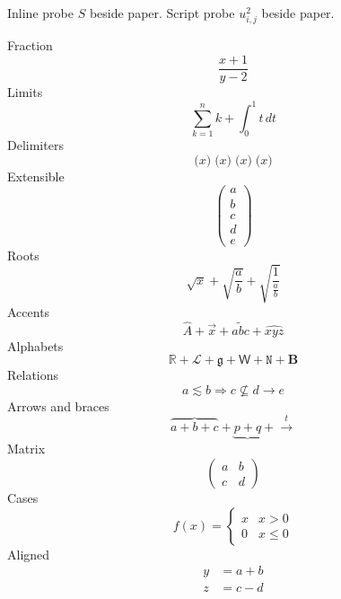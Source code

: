 \documentclass[10pt,letterpaper]{article}
\begin{document}
Inline probe $S$ beside paper. Script probe $u_{i,j}^{2}$ beside paper.

Fraction
\[ \frac{x+1}{y-2} \]
Limits
\[ \sum_{k=1}^{n} k + \int_{0}^{1} t\,dt \]
Delimiters
\[ \big(x\big)\;\Big(x\Big)\;\bigg(x\bigg)\;\Bigg(x\Bigg) \]
Extensible
\[ \left(\begin{matrix}a\\b\\c\\d\\e\end{matrix}\right) \]
Roots
\[ \sqrt{x}+\sqrt{\frac{a}{b}}+\sqrt{\frac{1}{\frac{a}{b}}} \]
Accents
\[ \hat A+\vec x+\widetilde{abc}+\widehat{xyz} \]
\newpage
Alphabets
\[ \mathbb{R}+\mathcal{L}+\mathfrak{g}+\mathsf{W}+\mathtt{N}+\mathbf{B} \]
Relations
\[ a\lesssim b\Rightarrow c\nsubseteq d\longrightarrow e \]
Arrows and braces
\[ \overbrace{a+b+c}+\underbrace{p+q}+\xrightarrow{t} \]
Matrix
\[ \begin{pmatrix}a&b\\c&d\end{pmatrix} \]
Cases
\[ f(x)=\begin{cases} x & x>0\\ 0 & x\leq 0\end{cases} \]
Aligned
\[ \begin{aligned} y&=a+b\\ z&=c-d\end{aligned} \]
\end{document}
